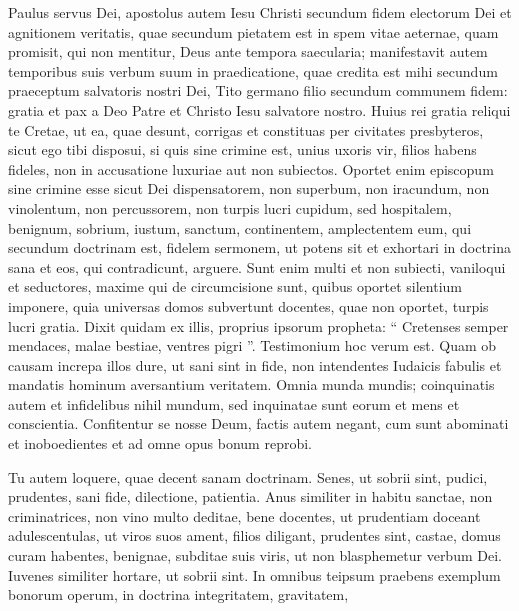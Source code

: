 \begin{biblechapter}
 \verse Paulus servus Dei, apostolus autem Iesu Christi secundum fidem electorum Dei et agnitionem veritatis, quae secundum pietatem est 
\verse in spem vitae aeternae, quam promisit, qui non mentitur, Deus ante tempora saecularia; 
\verse manifestavit autem temporibus suis verbum suum in praedicatione, quae credita est mihi secundum praeceptum salvatoris nostri Dei, 
 \verse Tito germano filio secundum communem fidem: gratia et pax a Deo Patre et Christo Iesu salvatore nostro.
 \verse Huius rei gratia reliqui te Cretae, ut ea, quae desunt, corrigas et constituas per civitates presbyteros, sicut ego tibi disposui, 
\verse si quis sine crimine est, unius uxoris vir, filios habens fideles, non in accusatione luxuriae aut non subiectos. 
\verse Oportet enim episcopum sine crimine esse sicut Dei dispensatorem, non superbum, non iracundum, non vinolentum, non percussorem, non turpis lucri cupidum, 
\verse sed hospitalem, benignum, sobrium, iustum, sanctum, continentem, 
\verse amplectentem eum, qui secundum doctrinam est, fidelem sermonem, ut potens sit et exhortari in doctrina sana et eos, qui contradicunt, arguere.
 \verse Sunt enim multi et non subiecti, vaniloqui et seductores, maxime qui de circumcisione sunt, 
\verse quibus oportet silentium imponere, quia universas domos subvertunt docentes, quae non oportet, turpis lucri gratia. 
\verse Dixit quidam ex illis, proprius ipsorum propheta: “ Cretenses semper mendaces, malae bestiae, ventres pigri ”. 
\verse Testimonium hoc verum est. Quam ob causam increpa illos dure, ut sani sint in fide, 
\verse non intendentes Iudaicis fabulis et mandatis hominum aversantium veritatem.
 \verse Omnia munda mundis; coinquinatis autem et infidelibus nihil mundum, sed inquinatae sunt eorum et mens et conscientia. 
\verse Confitentur se nosse Deum, factis autem negant, cum sunt abominati et inoboedientes et ad omne opus bonum reprobi.  
\begin{biblechapter}
\verse Tu autem loquere, quae decent sanam doctrinam.
 \verse Senes, ut sobrii sint, pudici, prudentes, sani fide, dilectione, patientia.
 \verse Anus similiter in habitu sanctae, non criminatrices, non vino multo deditae, bene docentes, 
\verse ut prudentiam doceant adulescentulas, ut viros suos ament, filios diligant, 
\verse prudentes sint, castae, domus curam habentes, benignae, subditae suis viris, ut non blasphemetur verbum Dei.
 \verse Iuvenes similiter hortare, ut sobrii sint. 
\verse In omnibus teipsum praebens exemplum bonorum operum, in doctrina integritatem, gravitatem, 

\end{biblechapter}
\end{biblechapter}
